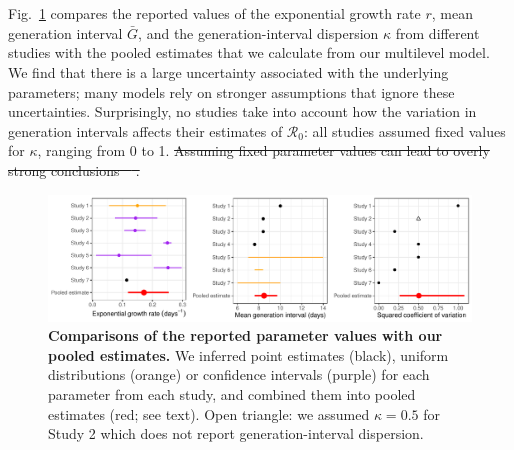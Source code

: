 \documentclass[12pt]{article}
\newcommand{\fref}[1]{Fig.~\ref{fig:#1}}
\newcommand{\Ro}{\ensuremath{{\mathcal R}_{0}}\xspace}
\providecommand{\DIFaddtex}[1]{{\protect\color{blue}\uwave{#1}}} %
\providecommand{\DIFdeltex}[1]{{\protect\color{red}\sout{#1}}}                      %
\providecommand{\DIFaddend}{} %
\providecommand{\DIFdelbegin}{} %
\providecommand{\DIFdelend}{} %
\providecommand{\DIFadd}[1]{\texorpdfstring{\DIFaddtex{#1}}{#1}} %
\providecommand{\DIFdel}[1]{\texorpdfstring{\DIFdeltex{#1}}{}} %
\newcommand{\DIFscaledelfig}{0.5}
\newlength{\DIFdelgraphicswidth} %
\newlength{\DIFdelgraphicsheight} %
\newcommand{\DIFdelincludegraphics}[2][]{%
\sbox{\DIFdelgraphicsbox}{\DIFOincludegraphics[#1]{#2}}%
\settoboxwidth{\DIFdelgraphicswidth}{\DIFdelgraphicsbox} %
\settoboxtotalheight{\DIFdelgraphicsheight}{\DIFdelgraphicsbox} %
\scalebox{\DIFscaledelfig}{%
\parbox[b]{\DIFdelgraphicswidth}{\usebox{\DIFdelgraphicsbox}\\[-\baselineskip] \rule{\DIFdelgraphicswidth}{0em}}\llap{\resizebox{\DIFdelgraphicswidth}{\DIFdelgraphicsheight}{%
\setlength{\unitlength}{\DIFdelgraphicswidth}%
\begin{picture}(1,1)%
\thicklines\linethickness{2pt} %
{\color[rgb]{1,0,0}\put(0,0){\framebox(1,1){}}}%
{\color[rgb]{1,0,0}\put(0,0){\line( 1,1){1}}}%
{\color[rgb]{1,0,0}\put(0,1){\line(1,-1){1}}}%
\end{picture}%
}\hspace*{3pt}}} %
} %
\DeclareRobustCommand{\DIFaddend}{\DIFOaddend \let\includegraphics\DIFOincludegraphics} %
\DeclareRobustCommand{\DIFdelbegin}{\DIFOdelbegin \let\includegraphics\DIFdelincludegraphics} %
\DeclareRobustCommand{\DIFdelend}{\DIFOaddend \let\includegraphics\DIFOincludegraphics} %
\begin{document}
\section{\DIFadd{Results}}

\DIFaddend \fref{assumption} compares the reported values of the exponential growth rate $r$, mean generation interval $\bar G$, and the generation-interval dispersion $\kappa$ from different studies with the pooled estimates that we calculate from our multilevel model.
We find that there is a large uncertainty associated with the underlying parameters;
many models rely on stronger assumptions that ignore these uncertainties.
Surprisingly, no studies take into account how the variation in generation intervals affects their estimates of \Ro:
all studies assumed fixed values for $\kappa$, ranging from 0 to 1.
\DIFdelbegin \DIFdel{Assuming fixed parameter values can lead to overly strong conclusions \mbox{%
\citep{elderd2006uncertainty}}\hspace{0pt}%
.
}\DIFdelend %

\begin{figure}[t]
\includegraphics[width=\textwidth]{compare_assumption.pdf}
\caption{
\textbf{Comparisons of the reported parameter values with our pooled estimates.}
We inferred point estimates (black), uniform distributions (orange) or confidence intervals (purple) for each parameter from each study, and combined them into pooled estimates (red; see text).
Open triangle: we assumed $\kappa=0.5$ for Study 2 which does not report generation-interval dispersion.
}
\label{fig:assumption}
\end{figure}
\end{document}
